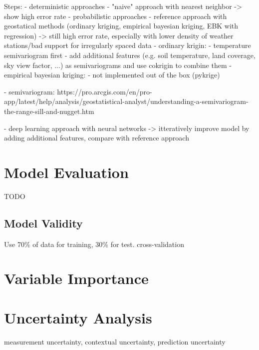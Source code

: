 Steps:
- deterministic approaches
  - "naive" approach with nearest neighbor -> show high error rate
- probabilistic approaches
  - reference approach with geostatical methods (ordinary kriging, empirical bayesian kriging, EBK with regression) -> still high error rate, especially with lower density of weather stations/bad support for irregularly spaced data
    - ordinary krigin:
        - temperature semivariogram first
        - add additional features (e.g. soil temperature, land coverage, sky view factor, ...) as semivariograms and use cokrigin to combine them
    - empirical bayesian kriging:
        - not implemented out of the box (pykrige)

  - semivariogram: https://pro.arcgis.com/en/pro-app/latest/help/analysis/geostatistical-analyst/understanding-a-semivariogram-the-range-sill-and-nugget.htm

- deep learning approach with neural networks -> itteratively improve model by adding additional features, compare with reference approach



\section{Model Evaluation}

TODO

\subsection{Model Validity}

Use 70\% of data for training, 30\% for test. cross-validation

\section{Variable Importance}

\section{Uncertainty Analysis}

measurement uncertainty, contextual uncertainty, prediction uncertainty


